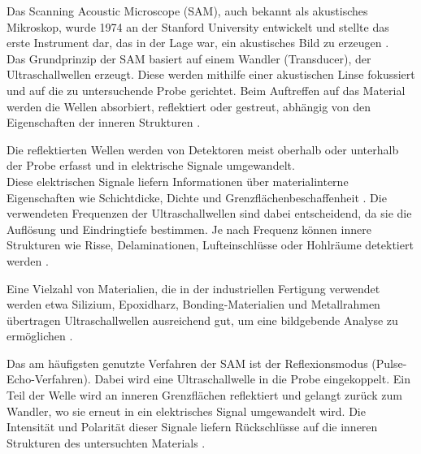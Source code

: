 Das Scanning Acoustic Microscope (SAM), auch bekannt als akustisches Mikroskop, wurde 1974 an der Stanford University entwickelt und stellte das erste Instrument dar, das in der Lage war, ein akustisches Bild zu erzeugen \cite{hennig2025}.\\

Das Grundprinzip der SAM basiert auf einem Wandler (Transducer), der Ultraschallwellen erzeugt. Diese werden mithilfe einer akustischen Linse fokussiert und auf die zu untersuchende Probe gerichtet. Beim Auftreffen auf das Material werden die Wellen absorbiert, reflektiert oder gestreut, abhängig von den Eigenschaften der inneren Strukturen \cite{pvateplaSAM, wikiSAM2024}.

Die reflektierten Wellen werden von Detektoren meist oberhalb oder unterhalb der Probe erfasst und in elektrische Signale umgewandelt. \\Diese elektrischen Signale liefern Informationen über materialinterne Eigenschaften wie Schichtdicke, Dichte und Grenzflächenbeschaffenheit \cite{pvateplaSAM}. Die verwendeten Frequenzen der Ultraschallwellen sind dabei entscheidend, da sie die Auflösung und Eindringtiefe bestimmen. Je nach Frequenz können innere Strukturen wie Risse, Delaminationen, Lufteinschlüsse oder Hohlräume detektiert werden \cite{wikiSAM2024}.

Eine Vielzahl von Materialien, die in der industriellen Fertigung verwendet werden etwa Silizium, Epoxidharz, Bonding-Materialien und Metallrahmen übertragen Ultraschallwellen ausreichend gut, um eine bildgebende Analyse zu ermöglichen \cite{hennig2025}.

Das am häufigsten genutzte Verfahren der SAM ist der Reflexionsmodus (Pulse-Echo-Verfahren). Dabei wird eine Ultraschallwelle in die Probe eingekoppelt. Ein Teil der Welle wird an inneren Grenzflächen reflektiert und gelangt zurück zum Wandler, wo sie erneut in ein elektrisches Signal umgewandelt wird. Die Intensität und Polarität dieser Signale liefern Rückschlüsse auf die inneren Strukturen des untersuchten Materials \cite{pvateplaSAM, wikiSAM2024}.
\\



